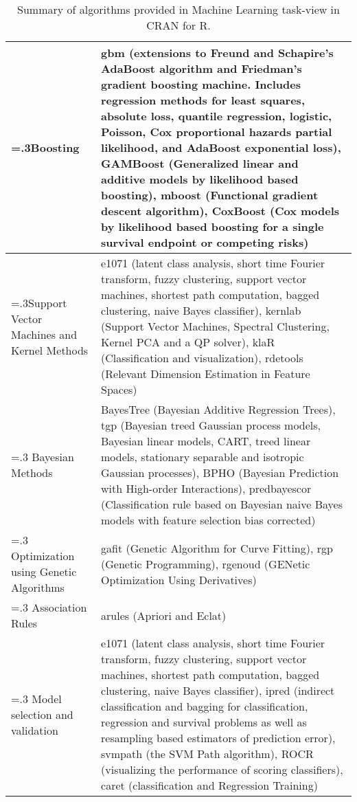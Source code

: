\documentclass[a4paper, 11pt]{article}
\begin{document}
\begin{table}[htp]
\begin{tabularx}{\textwidth}{>{\hsize=.3\hsize}XX}
		\midrule
		Boosting & gbm (extensions to Freund and Schapire's AdaBoost algorithm and Friedman's gradient boosting machine. Includes regression methods for least squares, absolute loss, quantile regression, logistic, Poisson, Cox proportional hazards partial likelihood, and AdaBoost exponential loss), GAMBoost (Generalized linear and additive models by likelihood based boosting), mboost (Functional gradient descent algorithm), CoxBoost (Cox models by likelihood based boosting for a single survival endpoint or competing risks) \\
		\midrule
		Support Vector Machines and Kernel Methods & e1071 (latent class analysis, short time Fourier transform, fuzzy clustering, support vector machines, shortest path computation, bagged clustering, naive Bayes classifier), kernlab (Support Vector Machines, Spectral Clustering, Kernel PCA and a QP solver), klaR (Classification and visualization), rdetools (Relevant Dimension Estimation in Feature Spaces) \\
		\midrule
		Bayesian Methods & BayesTree (Bayesian Additive Regression Trees), tgp (Bayesian treed Gaussian process models, Bayesian linear models, CART, treed linear models, stationary separable and isotropic Gaussian processes), BPHO (Bayesian Prediction with High-order Interactions), predbayescor (Classification rule based on Bayesian naive Bayes models with feature selection bias corrected)  \\
		\midrule
		Optimization using Genetic Algorithms & gafit (Genetic Algorithm for Curve Fitting), rgp (Genetic Programming), rgenoud (GENetic Optimization Using Derivatives) \\
		\midrule
		Association Rules & arules (Apriori and Eclat) \\
		\midrule
		Model selection and validation & e1071 (latent class analysis, short time Fourier transform, fuzzy clustering, support vector machines, shortest path computation, bagged clustering, naive Bayes classifier), ipred (indirect classification and bagging for classification, regression and survival problems as well as resampling based estimators of prediction error), svmpath (the SVM Path algorithm), ROCR (visualizing the performance of scoring classifiers), caret (classification and Regression Training) \\
		\bottomrule
		\end{tabularx}	
	\caption{Summary of algorithms provided in Machine Learning task-view in CRAN for R.}
	\label{tab:r}
\end{table}
\end{document}
